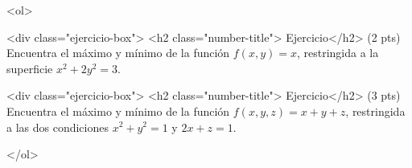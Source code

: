 \documentclass[12pt]{article}
\begin{document}
\bigskip

            
\bigskip
\bigskip
\bigskip






<ol>

<div class="ejercicio-box"> <h2 class="number-title"> Ejercicio</h2> (2 pts) Encuentra el máximo y mínimo de la función $f(x,y)=x$, restringida a la superficie
$x^2+2y^2=3$.


  \vspace{8cm}


<div class="ejercicio-box"> <h2 class="number-title"> Ejercicio</h2> (3 pts) Encuentra el máximo y mínimo de la función $f(x,y,z)=x+y+z$, restringida
a las dos condiciones $x^2+y^2=1$ y $2x+z=1$.
  

</ol>
 





  
\end{document}
